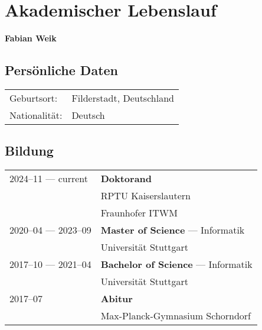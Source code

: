 \section*{Akademischer Lebenslauf}

\vspace{5mm}
\large
\textbf{Fabian Weik}
\normalsize

\subsection*{Persönliche Daten}

\begin{tabular}{ll}
  Geburtsort: & Filderstadt, Deutschland \\[0.2em]
  Nationalität: & Deutsch
\end{tabular}

\subsection*{Bildung}

\begin{tabular}{ll}
  2024--11 --- current            & \textbf{Doktorand} \\
                                  & RPTU Kaiserslautern \\
                                  & Fraunhofer ITWM \\[0.3em]
  2020--04 --- 2023--09           & \textbf{Master of Science} --- Informatik \\
                                  & Universität Stuttgart \\[0.3em]
  2017--10 --- 2021--04           & \textbf{Bachelor of Science} --- Informatik \\
                                  & Universität Stuttgart \\[0.3em]
  \phantom{2017--07 ---} 2017--07 & \textbf{Abitur} \\
                                  & Max-Planck-Gymnasium Schorndorf
\end{tabular}

